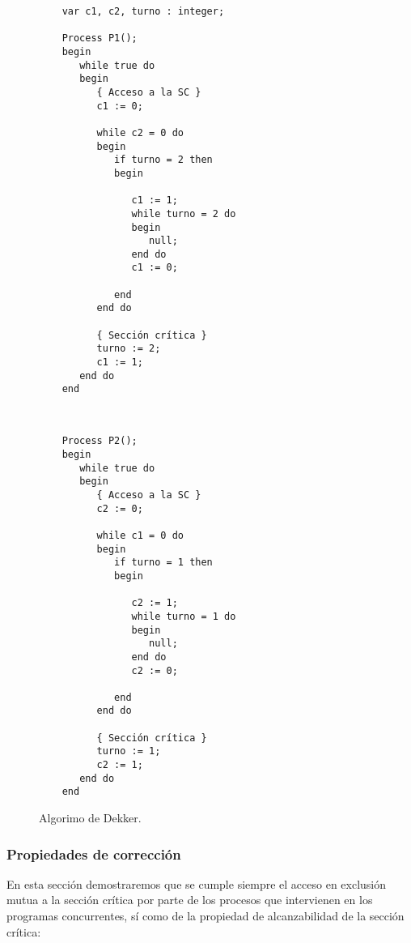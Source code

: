 \begin{figure}[H]
\setlength{\columnsep}{1cm}
\begin{multicols}{2}
    \begin{verbatim}
    var c1, c2, turno : integer;

    Process P1();
    begin
       while true do
       begin
          { Acceso a la SC }
          c1 := 0;

          while c2 = 0 do
          begin
             if turno = 2 then
             begin

                c1 := 1;
                while turno = 2 do
                begin
                   null;
                end do
                c1 := 0;

             end
          end do

          { Sección crítica }
          turno := 2;
          c1 := 1;
       end do
    end
\end{verbatim}
\begin{verbatim}


    Process P2();
    begin
       while true do
       begin
          { Acceso a la SC }
          c2 := 0;

          while c1 = 0 do
          begin
             if turno = 1 then
             begin

                c2 := 1;
                while turno = 1 do
                begin
                   null;
                end do
                c2 := 0;

             end
          end do

          { Sección crítica }
          turno := 1;
          c2 := 1;
       end do
    end
\end{verbatim}
\end{multicols}
\caption{Algorimo de Dekker.}
\end{figure}

\subsubsection{Propiedades de corrección}
En esta sección demostraremos que se cumple siempre el acceso en exclusión mutua a la sección crítica por parte de los procesos que intervienen en los programas concurrentes, sí como de la propiedad de alcanzabilidad de la sección crítica:

